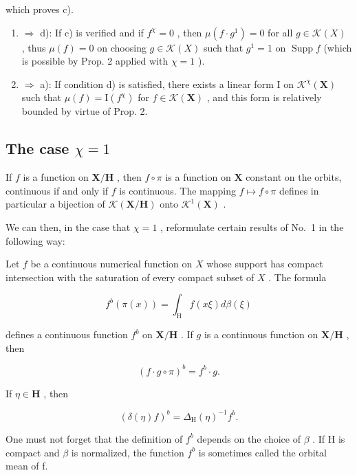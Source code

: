 which proves c).

\begin{enumerate}
\def\labelenumi{\alph{enumi})}
\setcounter{enumi}{2}
\item
  \(\Rightarrow\) d): If c) is verified and if \(f^{\chi} = 0\) , then \(\mu(f \cdot g^{1}) = 0\) for all \(g \in \mathcal{K}(X)\) , thus \(\mu(f) = 0\) on choosing \(g \in \mathcal{K}(X)\) such that \(g^{1} = 1\) on \(\operatorname{Supp} f\) (which is possible by Prop. 2 applied with \(\chi = 1\) ).
\item
  \(\Rightarrow\) a): If condition d) is satisfied, there exists a linear form I on \(\mathcal{K}^{\chi}(\mathbf{X})\) such that \(\mu(f) = \mathrm{I}(f^{\chi})\) for \(f \in \mathcal{K}(\mathbf{X})\) , and this form is relatively bounded by virtue of Prop. 2.
\end{enumerate}

\subsection{\texorpdfstring{The case \(\chi = 1\)}{The case \textbackslash chi = 1}}

If \(f\) is a function on \(\mathbf{X} / \mathbf{H}\) , then \(f \circ \pi\) is a function on \(\mathbf{X}\) constant on the orbits, continuous if and only if \(f\) is continuous. The mapping \(f \mapsto f \circ \pi\) defines in particular a bijection of \(\mathcal{K}(\mathbf{X} / \mathbf{H})\) onto \(\mathcal{K}^1(\mathbf{X})\) .

We can then, in the case that \(\chi = 1\) , reformulate certain results of No.~1 in the following way:

Let \(f\) be a continuous numerical function on \(X\) whose support has compact intersection with the saturation of every compact subset of \(X\) . The formula

\[
f ^ {b} (\pi (x)) = \int_ {\mathrm{H}} f (x \xi) d \beta (\xi)\tag{3}
\]

defines a continuous function \(f^{b}\) on \(\mathbf{X} / \mathbf{H}\) . If \(g\) is a continuous function on \(\mathbf{X} / \mathbf{H}\) , then

\[
(f \cdot g \circ \pi) ^ {b} = f ^ {b} \cdot g.\tag{4}
\]

If \(\eta \in \mathbf{H}\) , then

\[
\left(\delta (\eta) f\right) ^ {b} = \Delta_ {\mathrm{H}} (\eta) ^ {- 1} f ^ {b}.\tag{5}
\]

One must not forget that the definition of \(f^{b}\) depends on the choice of \(\beta\) . If H is compact and \(\beta\) is normalized, the function \(f^{b}\) is sometimes called the orbital mean of f.

